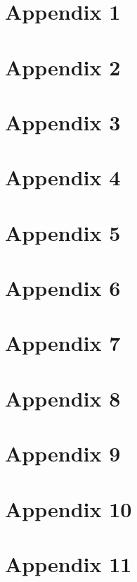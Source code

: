 \appendix
\section{Appendix 1}


\section{Appendix 2}


\section{Appendix 3}


\section{Appendix 4}


\section{Appendix 5}


\section{Appendix 6}


\section{Appendix 7}


\section{Appendix 8}


\section{Appendix 9}


\section{Appendix 10}


\section{Appendix 11}

